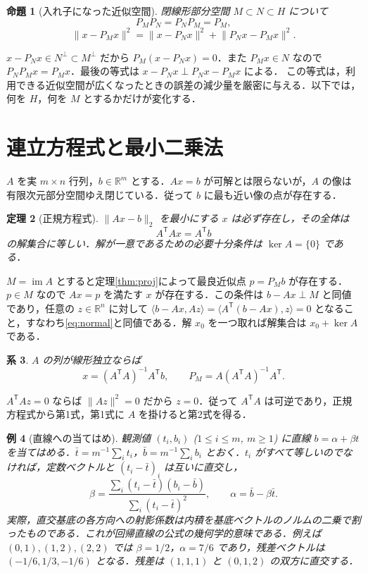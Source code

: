 \documentclass[a5paper,10pt,onecolumn]{jsarticle}
\makeatletter
\theoremstyle{mathnotetheorem}
\newtheorem{theorem}{定理}[section]
\newtheorem{proposition}[theorem]{命題}
\newtheorem{corollary}[theorem]{系}
\newtheorem{example}[theorem]{例}
\renewcommand{\proofname}{証明}
\renewenvironment{proof}[1][\proofname]{%
  \par\pushQED{\qed}\normalfont\topsep4\p@\@plus2\p@\relax
  \trivlist\item[\hskip\labelsep\bfseries #1]\ignorespaces
}{\popQED\endtrivlist\@endpefalse}
\newcommand{\R}{\mathbb{R}}
\newcommand{\norm}[1]{\lVert #1\rVert}
\makeatother
\begin{document}
\begin{proposition}[入れ子になった近似空間]\label{prop:nested}
閉線形部分空間 $M\subset N\subset H$ について
\[
 P_MP_N=P_NP_M=P_M,
\]
\[
 \norm{x-P_Mx}^2=\norm{x-P_Nx}^2+\norm{P_Nx-P_Mx}^2.
\]
\end{proposition}
\begin{proof}
$x-P_Nx\in N^\perp\subset M^\perp$ だから $P_M(x-P_Nx)=0$．また $P_Mx\in N$ なので $P_NP_Mx=P_Mx$．最後の等式は $x-P_Nx\perp P_Nx-P_Mx$ による．
\end{proof}
この等式は，利用できる近似空間が広くなったときの誤差の減少量を厳密に与える．以下では，何を $H$，何を $M$ とするかだけが変化する．

\section{連立方程式と最小二乗法}
$A$ を実 $m\times n$ 行列，$b\in\R^m$ とする．$Ax=b$ が可解とは限らないが，$A$ の像は有限次元部分空間ゆえ閉じている．従って $b$ に最も近い像の点が存在する．
\begin{theorem}[正規方程式]
$\norm{Ax-b}_2$ を最小にする $x$ は必ず存在し，その全体は
\begin{equation}\label{eq:normal}
 A^{\mathsf T}Ax=A^{\mathsf T}b
\end{equation}
の解集合に等しい．解が一意であるための必要十分条件は $\ker A=\{0\}$ である．
\end{theorem}
\begin{proof}
$M=\operatorname{im}A$ とすると定理\ref{thm:proj}によって最良近似点 $p=P_Mb$ が存在する．$p\in M$ なので $Ax=p$ を満たす $x$ が存在する．この条件は $b-Ax\perp M$ と同値であり，任意の $z\in\R^n$ に対して
$\langle b-Ax,Az\rangle=\langle A^{\mathsf T}(b-Ax),z\rangle=0$
となること，すなわち\eqref{eq:normal}と同値である．解 $x_0$ を一つ取れば解集合は $x_0+\ker A$ である．
\end{proof}
\begin{corollary}
$A$ の列が線形独立ならば
\[
 x=(A^{\mathsf T}A)^{-1}A^{\mathsf T}b,
 \qquad P_M=A(A^{\mathsf T}A)^{-1}A^{\mathsf T}.
\]
\end{corollary}
\begin{proof}
$A^{\mathsf T}Az=0$ ならば $\norm{Az}^2=0$ だから $z=0$．従って $A^{\mathsf T}A$ は可逆であり，正規方程式から第1式，第1式に $A$ を掛けると第2式を得る．
\end{proof}
\begin{example}[直線への当てはめ]
観測値 $(t_i,b_i)$ ($1\le i\le m$, $m\ge 1$) に直線 $b=\alpha+\beta t$ を当てはめる．$\bar t=m^{-1}\sum_i t_i$，$\bar b=m^{-1}\sum_i b_i$ とおく．$t_i$ がすべて等しいのでなければ，定数ベクトルと $(t_i-\bar t)_i$ は互いに直交し，
\[
 \beta=\frac{\sum_i(t_i-\bar t)(b_i-\bar b)}{\sum_i(t_i-\bar t)^2},
 \qquad \alpha=\bar b-\beta\bar t.
\]
実際，直交基底の各方向への射影係数は内積を基底ベクトルのノルムの二乗で割ったものである．これが回帰直線の公式の幾何学的意味である．例えば $(0,1),(1,2),(2,2)$ では $\beta=1/2$，$\alpha=7/6$ であり，残差ベクトルは $(-1/6,1/3,-1/6)$ となる．残差は $(1,1,1)$ と $(0,1,2)$ の双方に直交する．
\end{example}
\end{document}
